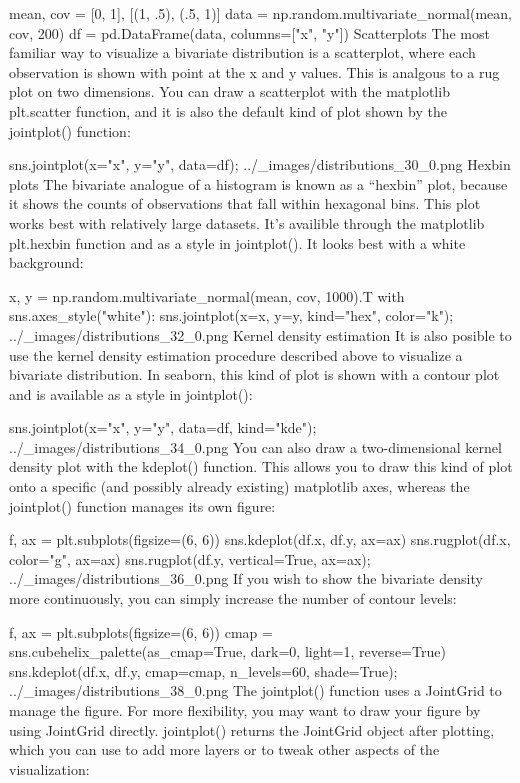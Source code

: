 mean, cov = [0, 1], [(1, .5), (.5, 1)]
data = np.random.multivariate_normal(mean, cov, 200)
df = pd.DataFrame(data, columns=["x", "y"])
Scatterplots
The most familiar way to visualize a bivariate distribution is a scatterplot, where each observation is shown with point at the x and y values. This is analgous to a rug plot on two dimensions. You can draw a scatterplot with the matplotlib plt.scatter function, and it is also the default kind of plot shown by the jointplot() function:

sns.jointplot(x="x", y="y", data=df);
../_images/distributions_30_0.png
Hexbin plots
The bivariate analogue of a histogram is known as a “hexbin” plot, because it shows the counts of observations that fall within hexagonal bins. This plot works best with relatively large datasets. It’s availible through the matplotlib plt.hexbin function and as a style in jointplot(). It looks best with a white background:

x, y = np.random.multivariate_normal(mean, cov, 1000).T
with sns.axes_style("white"):
    sns.jointplot(x=x, y=y, kind="hex", color="k");
../_images/distributions_32_0.png
Kernel density estimation
It is also posible to use the kernel density estimation procedure described above to visualize a bivariate distribution. In seaborn, this kind of plot is shown with a contour plot and is available as a style in jointplot():

sns.jointplot(x="x", y="y", data=df, kind="kde");
../_images/distributions_34_0.png
You can also draw a two-dimensional kernel density plot with the kdeplot() function. This allows you to draw this kind of plot onto a specific (and possibly already existing) matplotlib axes, whereas the jointplot() function manages its own figure:

f, ax = plt.subplots(figsize=(6, 6))
sns.kdeplot(df.x, df.y, ax=ax)
sns.rugplot(df.x, color="g", ax=ax)
sns.rugplot(df.y, vertical=True, ax=ax);
../_images/distributions_36_0.png
If you wish to show the bivariate density more continuously, you can simply increase the number of contour levels:

f, ax = plt.subplots(figsize=(6, 6))
cmap = sns.cubehelix_palette(as_cmap=True, dark=0, light=1, reverse=True)
sns.kdeplot(df.x, df.y, cmap=cmap, n_levels=60, shade=True);
../_images/distributions_38_0.png
The jointplot() function uses a JointGrid to manage the figure. For more flexibility, you may want to draw your figure by using JointGrid directly. jointplot() returns the JointGrid object after plotting, which you can use to add more layers or to tweak other aspects of the visualization:

